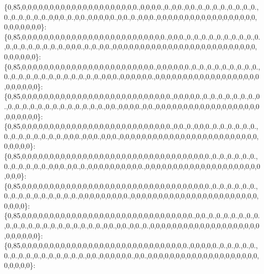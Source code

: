 \{0,85,0,0,0,0,0,0,0,0,0,0,0,0,0,0,0,0,0,0,0,0,0.,0,0,0,0.,0.,0,0.,0,0.,0.,0.,0.,0.,0.,0.,0.,0.,0.,0.,0.,0.,0.,0.,0,0,0.,0.,0,0.,0,0,0,0,0.,0,0.,0.,0,0,0.,0,0,0,0,0,0,0,0,0,0,0,0,0,0,0,0,0,0,0,0,0,0,0,0,0\}\+: \{0,85,0,0,0,0,0,0,0,0,0,0,0,0,0,0,0,0,0,0,0,0,0,0,0,0,0,0.,0,0,0.,0.,0.,0.,0.,0.,0.,0.,0.,0.,0.,0.,0.,0.,0.,0.,0.,0.,0.,0,0,0.,0.,0.,0,0.,0,0,0,0,0,0,0,0,0,0,0,0,0,0,0,0,0,0,0,0,0,0,0,0,0,0,0,0,0,0,0,0\}\+: \{0,85,0,0,0,0,0,0,0,0,0,0,0,0,0,0,0,0,0,0,0,0,0,0,0,0.,0,0,0,0,0,0.,0.,0.,0.,0.,0.,0.,0.,0.,0.,0.,0.,0.,0.,0.,0.,0.,0.,0.,0.,0.,0.,0.,0,0,0.,0,0,0,0,0,0.,0,0,0,0,0,0,0,0,0,0,0,0,0,0,0,0,0,0,0,0,0,0,0,0,0\}\+: \{0,85,0,0,0,0,0,0,0,0,0,0,0,0,0,0,0,0,0,0,0,0,0,0,0,0,0,0,0.,0,0,0,0,0.,0.,0.,0.,0.,0.,0.,0.,0.,0.,0.,0.,0.,0.,0.,0.,0.,0.,0.,0.,0.,0.,0,0.,0,0,0,0.,0,0.,0,0,0,0,0,0,0,0,0,0,0,0,0,0,0,0,0,0,0,0,0,0,0,0,0\}\+: \{0,85,0,0,0,0,0,0,0,0,0,0,0,0,0,0,0,0,0,0,0,0,0,0,0,0,0,0,0.,0,0.,0.,0,0,0.,0.,0.,0.,0.,0.,0.,0.,0.,0.,0.,0.,0.,0.,0.,0,0,0.,0,0,0.,0,0,0.,0,0,0,0,0,0,0,0,0,0,0,0,0,0,0,0,0,0,0,0,0,0,0,0,0,0,0,0,0,0\}\+: \{0,85,0,0,0,0,0,0,0,0,0,0,0,0,0,0,0,0,0,0,0,0,0,0,0,0,0,0,0,0,0,0,0,0,0,0.,0.,0.,0.,0.,0.,0.,0.,0.,0.,0.,0.,0.,0,0,0.,0,0.,0.,0,0,0,0,0,0,0,0,0,0.,0,0,0,0,0,0,0,0,0,0,0,0,0,0,0,0,0,0,0,0,0,0,0,0\}\+: \{0,85,0,0,0,0,0,0,0,0,0,0,0,0,0,0,0,0,0,0,0,0,0,0,0,0,0,0,0,0,0,0,0,0,0,0.,0.,0.,0.,0.,0.,0.,0.,0.,0.,0.,0.,0.,0.,0.,0.,0.,0,0,0,0,0,0,0,0,0.,0,0,0,0,0,0,0,0,0,0,0,0,0,0,0,0,0,0,0,0,0,0,0,0,0,0,0\}\+: \{0,85,0,0,0,0,0,0,0,0,0,0,0,0,0,0,0,0,0,0,0,0,0,0,0,0,0,0,0,0,0,0,0.,0,0.,0.,0.,0.,0.,0.,0.,0.,0.,0.,0.,0.,0.,0.,0.,0.,0.,0.,0.,0.,0.,0,0.,0,0.,0,0.,0.,0,0,0,0,0,0,0,0,0,0,0,0,0,0,0,0,0,0,0,0,0,0,0,0,0,0\}\+: \{0,85,0,0,0,0,0,0,0,0,0,0,0,0,0,0,0,0,0,0,0,0,0,0,0,0,0,0,0,0,0,0.,0,0,0,0,0.,0.,0.,0.,0.,0.,0.,0.,0.,0.,0.,0.,0.,0.,0.,0.,0.,0,0.,0,0,0,0,0,0.,0,0.,0,0,0,0,0,0,0,0,0,0,0,0,0,0,0,0,0,0,0,0,0,0,0,0,0\}\+: 